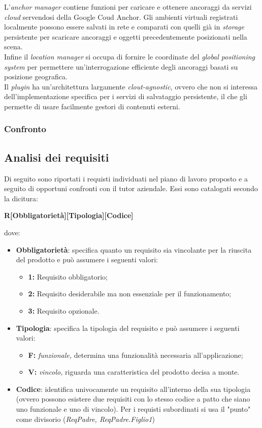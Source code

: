 L'\textit{anchor manager} contiene funzioni per caricare e ottenere ancoraggi da servizi \textit{cloud} servendosi della \api{} Google Coud Anchor. Gli ambienti virtuali registrati localmente possono essere salvati in rete e comparati con quelli già in \textit{storage} persistente per scaricare ancoraggi e oggetti precedentemente posizionati nella scena.\\
Infine il \textit{location manager} si occupa di fornire le coordinate del \textit{global positioning system}  per permettere un'interrogazione efficiente degli ancoraggi basati su posizione geografica.\\
Il \textit{plugin} ha un'architettura largamente \textit{clout-agnostic}, ovvero che non si interessa dell'implementazione specifica per i servizi di salvataggio persistente, il che gli permette di usare facilmente gestori di contenuti esterni.

\subsubsection{Confronto}

\subsection{Analisi dei requisiti}
Di seguito sono riportati i requisti individuati nel piano di lavoro proposto e a seguito di opportuni confronti con il tutor aziendale. Essi sono catalogati secondo la dicitura:
\begin{center}
    \textbf{R[Obbligatorietà][Tipologia][Codice]}
\end{center}
dove:
\begin{itemize}
    \item \textbf{Obbligatorietà}: specifica quanto un requisito sia vincolante per la riuscita del prodotto e può assumere i seguenti valori:
    \begin{itemize}
        \item \textbf{1: } Requisito obbligatorio;
        \item \textbf{2: } Requisito desiderabile ma non essenziale per il funzionamento;
        \item \textbf{3: } Requisito opzionale.
    \end{itemize}
    \item \textbf{Tipologia}: specifica la tipologia del requisito e può assumere i seguenti valori:
    \begin{itemize}
        \item \textbf{F: }\textit{funzionale,} determina una funzionalità necessaria all'applicazione;
        \item \textbf{V: }\textit{vincolo,} riguarda una caratteristica del prodotto decisa a monte.
    \end{itemize}
    \item \textbf{Codice}: identifica univocamente un requisito all'interno della sua tipologia (ovvero possono esistere due requisiti con lo stesso codice a patto che siano uno funzionale e uno di vincolo). Per i requisti subordinati si usa il "punto" come divisorio (\textit{ReqPadre, ReqPadre.Figlio1})
\end{itemize}

